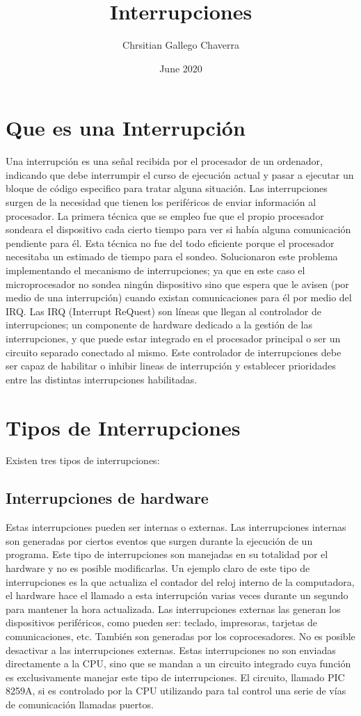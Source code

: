 \documentclass{article}
\title{Interrupciones}
\author{Chrsitian Gallego Chaverra}
\date{June 2020}
\begin{document}
\maketitle

\section{Que es una Interrupción}
Una interrupción es una señal recibida por el procesador de un ordenador, indicando que debe interrumpir el curso de ejecución actual y pasar a ejecutar un bloque de código especifico para tratar alguna situación.\cite{def}
Las interrupciones surgen de la necesidad que tienen los periféricos de enviar información al procesador. La primera técnica que se empleo fue que el propio procesador sondeara el dispositivo cada cierto tiempo para ver si había alguna comunicación pendiente para él. Esta técnica no fue del todo eficiente porque el procesador necesitaba un estimado de tiempo para el sondeo. Solucionaron este problema implementando el mecanismo de interrupciones; ya que en este caso el microprocesador no sondea ningún dispositivo sino que espera que le avisen (por medio de una interrupción) cuando existan comunicaciones para él por medio del IRQ. Las IRQ (Interrupt ReQuest) son líneas que llegan al controlador de interrupciones; un componente de hardware dedicado a la gestión de las interrupciones, y que puede estar integrado en el procesador principal o ser un circuito separado conectado al mismo. Este controlador de interrupciones debe ser capaz de habilitar o inhibir lineas de interrupción y establecer prioridades entre las distintas interrupciones habilitadas. 

\section{Tipos de Interrupciones}
Existen tres tipos de interrupciones:
\subsection{Interrupciones de hardware}
Estas interrupciones pueden ser internas o externas.
Las interrupciones internas son generadas por ciertos eventos que surgen durante la ejecución de un programa.
Este tipo de interrupciones son manejadas en su totalidad por el hardware y no es posible modificarlas.
Un ejemplo claro de este tipo de interrupciones es la que actualiza el contador del reloj interno de la computadora, el hardware hace el llamado a esta interrupción varias veces durante un segundo para mantener la hora actualizada.
Las interrupciones externas las generan los dispositivos periféricos, como pueden ser: teclado, impresoras, tarjetas de comunicaciones, etc. También son generadas por los coprocesadores.
No es posible desactivar a las interrupciones externas.
Estas interrupciones no son enviadas directamente a la CPU, sino que se mandan a un circuito integrado cuya función es exclusivamente manejar este tipo de interrupciones. El circuito, llamado PIC 8259A\cite{8259}, si es controlado por la CPU utilizando para tal control una serie de vías de comunicación llamadas puertos.
\end{document}
